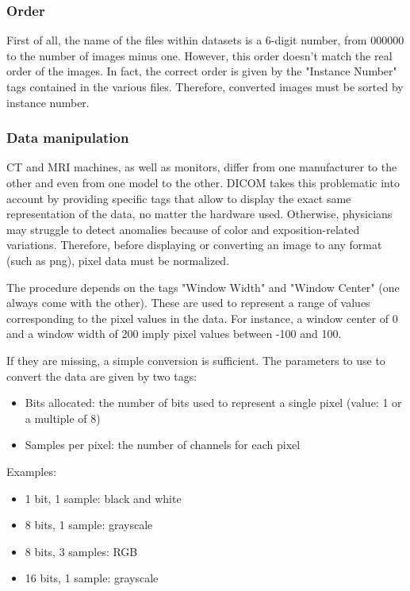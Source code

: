 \subsubsection{Order}
First of all, the name of the files within datasets is a 6-digit number, from 000000 to the number of images minus one. However, this order doesn’t match the real order of the images. In fact, the correct order is given by the "Instance Number" tags contained in the various files. Therefore, converted images must be sorted by instance number. 

\subsubsection{Data manipulation}
\label{sec:data_manipulation}
CT and MRI machines, as well as monitors, differ from one manufacturer to the other and even from one model to the other. DICOM takes this problematic into account by providing specific tags that allow to display the exact same representation of the data, no matter the hardware used. Otherwise, physicians may struggle to detect anomalies because of color and exposition-related variations. 
Therefore, before displaying or converting an image to any format (such as png), pixel data must be normalized. 

The procedure depends on the tags "Window Width" and "Window Center" (one always come with the other). These are used to represent a range of values corresponding to the pixel values in the data. For instance, a window center of 0 and a window width of 200 imply pixel values between -100 and 100. 

If they are missing, a simple conversion is sufficient. The parameters to use to convert the data are given by two tags: 
\begin{itemize}
	\item Bits allocated: the number of bits used to represent a single pixel (value: 1 or a multiple of 8)
	\item Samples per pixel: the number of channels for each pixel

\end{itemize}

\noindent Examples: 
\begin{itemize}
\item 1 bit, 1 sample: black and white
\item 8 bits, 1 sample: grayscale
\item 8 bits, 3 samples: RGB
\item 16 bits, 1 sample: grayscale

\end{itemize} 

